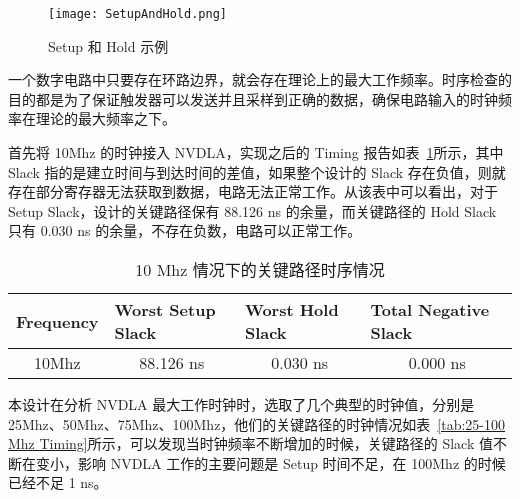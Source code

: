\begin{figure}[!htbp]
    \centering
    \texttt{[image: SetupAndHold.png]}
    \caption{Setup 和 Hold 示例}
    \label{fig:Setup and Hold}
\end{figure}

一个数字电路中只要存在环路边界，就会存在理论上的最大工作频率。时序检查的目的都是为了保证触发器可以发送并且采样到正确的数据，确保电路输入的时钟频率在理论的最大频率之下。

首先将 10Mhz 的时钟接入 NVDLA，实现之后的 Timing 报告如表~\ref{tab:10Mhz Timing}所示，其中 Slack 指的是建立时间与到达时间的差值，如果整个设计的 Slack 存在负值，则就存在部分寄存器无法获取到数据，电路无法正常工作。从该表中可以看出，对于 Setup Slack，设计的关键路径保有 88.126 ns 的余量，而关键路径的 Hold Slack 只有 0.030 ns 的余量，不存在负数，电路可以正常工作。

\begin{table}[!htbp]
    \caption{10 Mhz 情况下的关键路径时序情况}
    \label{tab:10Mhz Timing}
    \centering
    \footnotesize%
    \setlength{\tabcolsep}{4pt}%
    \renewcommand{\arraystretch}{1.2}%
    \begin{tabular}{llll}
        \toprule
        \textbf{Frequency}        & \textbf{Worst Setup Slack}    & \textbf{Worst Hold Slack}    & \textbf{Total Negative Slack} \\
        \midrule
        \multicolumn{1}{c}{10Mhz} & \multicolumn{1}{c}{88.126 ns} & \multicolumn{1}{c}{0.030 ns} & \multicolumn{1}{c}{0.000 ns} \\
        \bottomrule                   
    \end{tabular}
\end{table}

本设计在分析 NVDLA 最大工作时钟时，选取了几个典型的时钟值，分别是 25Mhz、50Mhz、75Mhz、100Mhz，他们的关键路径的时钟情况如表~\ref{tab:25-100 Mhz Timing}所示，可以发现当时钟频率不断增加的时候，关键路径的 Slack 值不断在变小，影响 NVDLA 工作的主要问题是 Setup 时间不足，在 100Mhz 的时候已经不足 1 ns。

